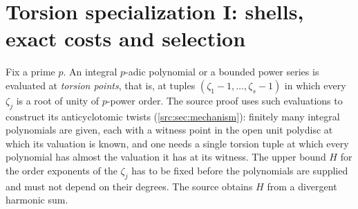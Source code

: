 \providecommand{\costfiles}[1]{\begin{itemize}[nosep,leftmargin=1.5em,label=--]\footnotesize #1\end{itemize}}
\section{Torsion specialization I: shells, exact costs and selection}\label{sec:tors}

\providecommand{\torsHs}{H_{*}}
\providecommand{\torslen}{\operatorname{length}}
\providecommand{\torscoker}{\operatorname{coker}}
\providecommand{\torsadj}{\operatorname{adj}}
\providecommand{\torsFitt}{\operatorname{Fitt}}
\providecommand{\torsZ}[2]{Z_{[#1,#2]}}
\providecommand{\torsU}{\mathcal{U}}
\providecommand{\torsfiles}[1]{\begin{itemize}[nosep,leftmargin=1.5em,label=--]\footnotesize #1\end{itemize}}
\makeatletter\providecommand{\torsalsolabel}[1]{\ltx@label{#1}}\makeatother

Fix a prime $p$. An integral $p$-adic polynomial or a bounded power series is evaluated at
\emph{torsion points}, that is, at tuples $(\zeta_1-1,\dots,\zeta_s-1)$ in which every
$\zeta_j$ is a root of unity of $p$-power order. The source proof uses such evaluations to
construct its anticyclotomic twists (\cref{src:sec:mechanism}): finitely many integral
polynomials are given, each with a witness point in the open unit polydisc at which its
valuation is known, and one needs a single torsion tuple at which every polynomial has
almost the valuation it has at its witness. The upper bound $H$ for the order exponents of
the $\zeta_j$ has to be fixed before the polynomials are supplied and must not depend on
their degrees. The source obtains $H$ from a divergent harmonic sum.

